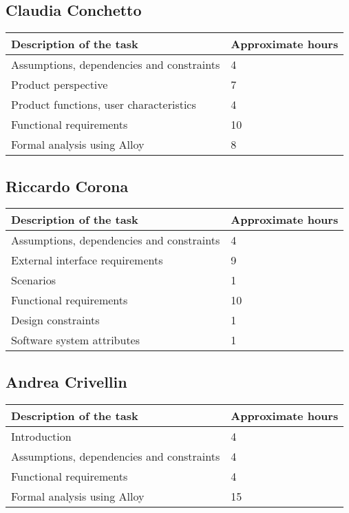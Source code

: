 
%

\subsection{Claudia Conchetto}
\begin{table}[h!]
\begin{tabular}{|l|l|}
\hline
\textbf{Description of the task} & \textbf{Approximate hours} \\ \hline
Assumptions, dependencies and constraints & 4 \\ \hline
Product perspective & 7 \\ \hline
Product functions, user characteristics & 4 \\ \hline
Functional requirements & 10 \\ \hline
Formal analysis using Alloy & 8 \\ \hline
\end{tabular}
\end{table}

\subsection{Riccardo Corona}
\begin{table}[h!]
\begin{tabular}{|l|l|}
\hline
\textbf{Description of the task} & \textbf{Approximate hours} \\ \hline
Assumptions, dependencies and constraints & 4 \\ \hline
External interface requirements & 9 \\ \hline
Scenarios & 1 \\ \hline
Functional requirements & 10 \\ \hline
Design constraints & 1 \\ \hline
Software system attributes & 1 \\ \hline
\end{tabular}
\end{table}

\subsection{Andrea Crivellin}
\begin{table}[h!]
\begin{tabular}{|l|l|}
\hline
\textbf{Description of the task} & \textbf{Approximate hours} \\ \hline
Introduction & 4 \\ \hline
Assumptions, dependencies and constraints & 4 \\ \hline
Functional requirements & 4 \\ \hline
Formal analysis using Alloy & 15 \\ \hline
\end{tabular}
\end{table}

%